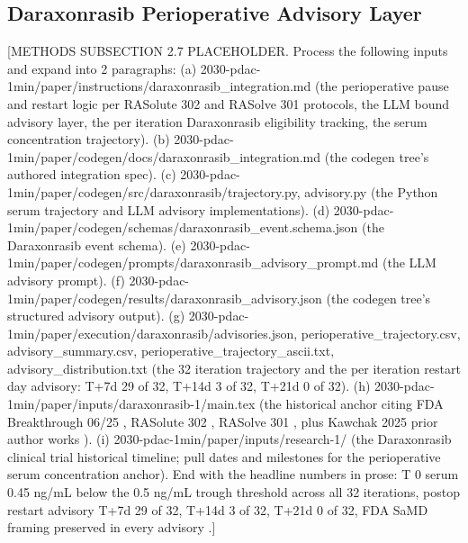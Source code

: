 \subsection{Daraxonrasib Perioperative Advisory Layer}
\label{sec:methods-daraxonrasib}

[METHODS SUBSECTION 2.7 PLACEHOLDER. Process the following inputs and expand into 2 paragraphs:
(a) 2030-pdac-1min/paper/instructions/daraxonrasib_integration.md (the perioperative pause and restart logic per RASolute 302 and RASolve 301 protocols, the LLM bound advisory layer, the per iteration Daraxonrasib eligibility tracking, the serum concentration trajectory).
(b) 2030-pdac-1min/paper/codegen/docs/daraxonrasib_integration.md (the codegen tree's authored integration spec).
(c) 2030-pdac-1min/paper/codegen/src/daraxonrasib/{trajectory.py, advisory.py} (the Python serum trajectory and LLM advisory implementations).
(d) 2030-pdac-1min/paper/codegen/schemas/daraxonrasib_event.schema.json (the Daraxonrasib event schema).
(e) 2030-pdac-1min/paper/codegen/prompts/daraxonrasib_advisory_prompt.md (the LLM advisory prompt).
(f) 2030-pdac-1min/paper/codegen/results/daraxonrasib_advisory.json (the codegen tree's structured advisory output).
(g) 2030-pdac-1min/paper/execution/daraxonrasib/{advisories.json, perioperative_trajectory.csv, advisory_summary.csv, perioperative_trajectory_ascii.txt, advisory_distribution.txt} (the 32 iteration trajectory and the per iteration restart day advisory: T+7d 29 of 32, T+14d 3 of 32, T+21d 0 of 32).
(h) 2030-pdac-1min/paper/inputs/daraxonrasib-1/main.tex (the historical anchor citing FDA Breakthrough 06/25 \cite{rev-fda-breakthrough}, RASolute 302 \cite{rasolute302}, RASolve 301 \cite{rasolve301}, plus Kawchak 2025 prior author works \cite{kawchak_2025_15735068, kawchak_2025_16415815, kawchak_2025_17001137, kawchak_2025_17239510, kawchak_2025_18099351}).
(i) 2030-pdac-1min/paper/inputs/research-1/ (the Daraxonrasib clinical trial historical timeline; pull dates and milestones for the perioperative serum concentration anchor).
End with the headline numbers in prose: T 0 serum 0.45 ng/mL below the 0.5 ng/mL trough threshold across all 32 iterations, postop restart advisory T+7d 29 of 32, T+14d 3 of 32, T+21d 0 of 32, FDA SaMD framing preserved in every advisory \cite{fda-samd}.]
